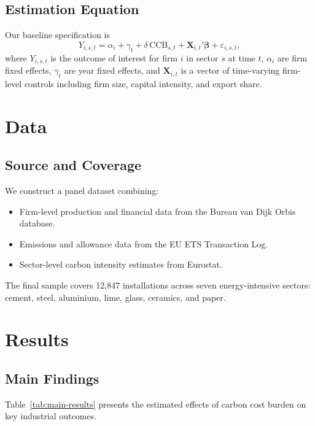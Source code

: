 \documentclass[
    language=english,
    doctype=article,
    institution=none,
    titlestyle=book,
]{../../omnilatex}
\begin{document}
\subsection{Estimation Equation}
Our baseline specification is
\begin{equation}
    Y_{i,s,t} = \alpha_i + \gamma_t + \delta \, \text{CCB}_{s,t} + \mathbf{X}_{i,t}'\boldsymbol{\beta} + \varepsilon_{i,s,t},
    \label{eq:did}
\end{equation}
where $Y_{i,s,t}$ is the outcome of interest for firm $i$ in sector $s$ at
time $t$, $\alpha_i$ are firm fixed effects, $\gamma_t$ are year fixed
effects, and $\mathbf{X}_{i,t}$ is a vector of time-varying firm-level
controls including firm size, capital intensity, and export share.

\section{Data}

\subsection{Source and Coverage}
We construct a panel dataset combining:
\begin{itemize}
    \item Firm-level production and financial data from the Bureau van Dijk
    Orbis database.
    \item Emissions and allowance data from the EU ETS Transaction Log.
    \item Sector-level carbon intensity estimates from Eurostat.
\end{itemize}
The final sample covers 12,847 installations across seven energy-intensive
sectors: cement, steel, aluminium, lime, glass, ceramics, and paper.

\section{Results}

\subsection{Main Findings}
Table~\ref{tab:main-results} presents the estimated effects of carbon cost
burden on key industrial outcomes.
\end{document}
